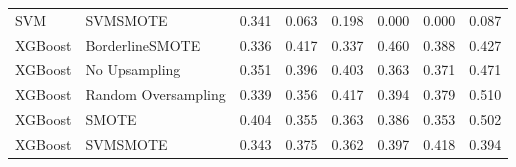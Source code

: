 \begin{tabular}{llllllll}
                            SVM &                      SVMSMOTE & 0.341 &                     0.063 &                 0.198 &                  0.000 &                                   0.000 &    0.087 \\
                        XGBoost &               BorderlineSMOTE & 0.336 &                     0.417 &                 0.337 &                  0.460 &                                   0.388 &    0.427 \\
                        XGBoost &                 No Upsampling & 0.351 &                     0.396 &                 0.403 &                  0.363 &                                   0.371 &    0.471 \\
                        XGBoost &           Random Oversampling & 0.339 &                     0.356 &                 0.417 &                  0.394 &                                   0.379 &    0.510 \\
                        XGBoost &                         SMOTE & 0.404 &                     0.355 &                 0.363 &                  0.386 &                                   0.353 &    0.502 \\
                        XGBoost &                      SVMSMOTE & 0.343 &                     0.375 &                 0.362 &                  0.397 &                                   0.418 &    0.394 \\
\bottomrule
\end{tabular}
